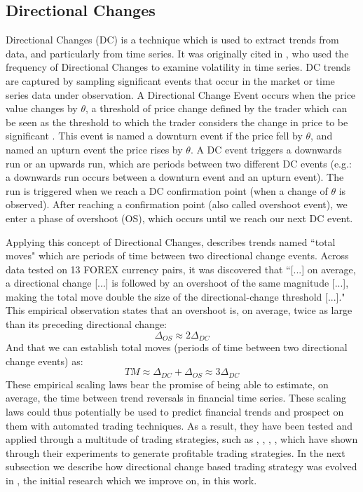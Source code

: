 \documentclass[conference]{IEEEtran}
\begin{document}
\subsection{Directional Changes}

Directional Changes (DC) is a technique which is used to extract trends from data, and particularly from time series. It was originally cited in \cite{dc_origin_paper}, who used the frequency of Directional Changes to examine volatility in time series. 
DC trends are captured by sampling significant events that occur in the market or time series data under observation. A Directional Change Event occurs when the price value changes by $\theta$, a threshold of price change defined by the trader which can be seen as the threshold to which the trader considers the change in price to be significant \cite{tsang_dc}. This event is named a downturn event if the price fell by $\theta$, and named an upturn event the price rises by $\theta$. A DC event triggers a downwards run or an upwards run, which are periods between two different DC events (e.g.: a downwards run occurs between a downturn event and an upturn event). The run is triggered when we reach a DC confirmation point (when a change of $\theta$ is observed). 
After reaching a confirmation point (also called overshoot event), we enter a phase of overshoot (OS), which occurs until we reach our next DC event. 

Applying this concept of Directional Changes,\cite{dc_scaling_laws} describes trends named ``total moves" which are periods of time between two directional change events. Across data tested on 13 FOREX currency pairs, it was discovered that ``[...] on average, a directional change [...] is followed by an overshoot of the same magnitude [...], making the total move double the size of the directional-change threshold [...]." This empirical observation states that an overshoot is, on average, twice as large than its preceding directional change:
\begin{equation}
\Delta_{OS} \approx 2\Delta_{DC}\label{eq2dc}
\end{equation}
And that we can establish total moves (periods of time between two directional change events) as: 
\begin{equation} 
TM  \approx \Delta_{DC} +  \Delta_{OS} \approx 3 \Delta_{DC}\label{eqtm}
\end{equation}
These empirical scaling laws bear the promise of being able to estimate, on average, the time between trend reversals in financial time series. These scaling laws could thus potentially be used to predict financial trends and prospect on them with automated trading techniques. As a result, they have been tested and applied through a multitude of trading strategies, such as \cite{kampouridis_otero_dc_ga}, \cite{backlash_agent}, \cite{dc_alpha_engine}, \cite{gypteau_dc_gp}, which have shown through their experiments to generate profitable trading strategies. In the next subsection we describe how directional change based trading strategy was evolved in \cite{kampouridis_otero_dc_ga}, the initial research which we improve on, in this work.
\end{document}
